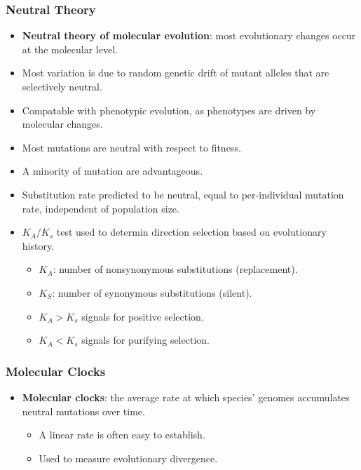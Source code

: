 \documentclass[12pt,a4paper]{article}
\begin{document}
\begin{itemize}
    \subsubsection{Neutral Theory}
        \begin{itemize}
        \item \textbf{Neutral theory of molecular evolution}: most evolutionary changes occur at the molecular level.
        \item Most variation is due to random genetic drift of mutant alleles that are selectively neutral.
        \item Compatable with phenotypic evolution, as phenotypes are driven by molecular changes.
        \item Most mutations are neutral with respect to fitness.
        \item A minority of mutation are advantageous.
        \item Substitution rate predicted to be neutral, equal to per-individual mutation rate, {\color{o-Sun}independent} of population size. 
        \item \(K_A / K_s\) test used to determin direction selection based on evolutionary history.
            \begin{itemize}
                \item \(K_A\): number of nonsynonymous substitutions (replacement).
                \item \(K_S\): number of synonymous substitutions (silent).
                \item {\color{pos}\(K_A > K_s\)} signals for {\color{pos}positive selection}.
                \item {\color{neg}\(K_A < K_s\)} signals for {\color{neg}purifying selection}.
            \end{itemize}
        \end{itemize}
    \subsubsection{Molecular Clocks}
    \begin{itemize}
        \item \textbf{Molecular clocks}: the average rate at which species' genomes accumulates {\color{o-Sun}neutral mutations} over time.
        \begin{itemize}
            \item A linear rate is often easy to establish.
            \item Used to measure evolutionary divergence.
        \end{itemize}
    \end{itemize}
\end{itemize}
\end{document}
